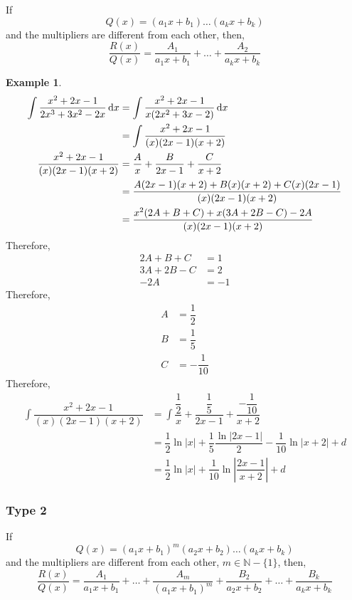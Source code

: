\documentclass[fleqn]{article}
\theoremstyle{definition}
\newtheorem{example}{Example}
\theoremstyle{theorem}
\theoremstyle{remark}
\begin{document}
If 
\begin{equation*}
	Q(x) = (a_1 x + b_1) \dots (a_k x + b_k)
\end{equation*}
and the multipliers are different from each other, then,
\begin{equation*}
	\dfrac{R(x)}{Q(x)} = \dfrac{A_1}{a_1 x + b_1} + \dots + \dfrac{A_2}{a_k x + b_k}
\end{equation*}

\begin{example}
	\begin{align*}
		\int \dfrac{x^2 + 2x - 1}{2x^3 + 3x^2 - 2x} \dif x &= \int \dfrac{x^2 + 2x - 1}{x(2x^2 + 3x - 2)} \dif x\\
		&= \int \dfrac{x^2 + 2x - 1}{(x)(2x - 1)(x + 2)}\\
		\dfrac{x^2 + 2x - 1}{(x)(2x - 1)(x + 2)}&= \dfrac{A}{x} + \dfrac{B}{2x - 1} + \dfrac{C}{x + 2}\\
		&= \dfrac{A(2x - 1)(x + 2) + B(x)(x + 2) + C(x)(2x - 1)}{(x)(2x - 1)(x + 2)}\\
		&= \dfrac{x^2(2A + B + C) + x(3A + 2B - C) - 2A}{(x)(2x - 1)(x + 2)}
	\end{align*}
	Therefore,
	\begin{align*}
		2A + B + C &= 1\\
		3A + 2B - C &= 2\\
		-2A &= -1
	\end{align*}
	Therefore, 
	\begin{align*}
		A &= \dfrac{1}{2}\\
		B &= \dfrac{1}{5}\\
		C &= -\dfrac{1}{10}
	\end{align*}
	Therefore, 
	\begin{align*}
		\int \dfrac{x^2 + 2x - 1}{(x)(2x - 1)(x + 2)} &= \int \dfrac{\dfrac{1}{2}}{x} + \dfrac{\dfrac{1}{5}}{2x - 1} + \dfrac{-\dfrac{1}{10}}{x + 2}\\
		&= \dfrac{1}{2} \ln |x| + \dfrac{1}{5} \dfrac{\ln |2x-1|}{2} - \dfrac{1}{10} \ln |x + 2| + d\\
		&= \dfrac{1}{2} \ln |x| + \dfrac{1}{10} \ln \left|\dfrac{2x - 1}{x + 2}\right| + d
	\end{align*}
\end{example}

\subsubsection{Type 2}

If 
\begin{equation*}
Q(x) = (a_1 x + b_1)^m (a_2 x + b_2) \dots (a_k x + b_k)
\end{equation*}
and the multipliers are different from each other, $m \in \mathbb{N} - \{1\}$, then,
\begin{equation*}
\dfrac{R(x)}{Q(x)} = \dfrac{A_1}{a_1 x + b_1} + \dots + \dfrac{A_m}{(a_1 x + b_1)^m} + \dfrac{B_2}{a_2 x + b_2} + \dots + \dfrac{B_k}{a_k x + b_k}
\end{equation*}
\end{document}
